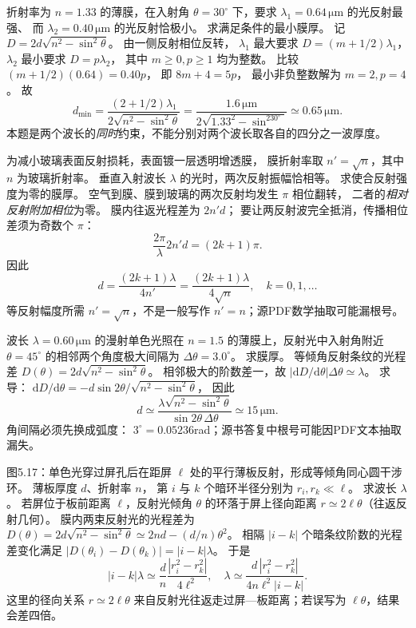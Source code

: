 折射率为 $n=1.33$ 的薄膜，在入射角
$\theta=30^\circ$ 下，要求
$\lambda_1=0.64\,\mathrm{\mu m}$ 的光反射最强、
而 $\lambda_2=0.40\,\mathrm{\mu m}$ 的光反射恰极小。
求满足条件的最小膜厚。
\exsolution
记
$D=2d\sqrt{n^2-\sin^2\theta}$。
由一侧反射相位反转，
$\lambda_1$ 最大要求
$D=(m+1/2)\lambda_1$，
$\lambda_2$ 最小要求
$D=p\lambda_2$，
其中 $m\ge0,p\ge1$ 均为整数。
比较
$(m+1/2)(0.64)=0.40p$，
即 $8m+4=5p$，
最小非负整数解为
$m=2,p=4$。
故
\[
\boxed{d_{\min}=
\frac{(2+1/2)\lambda_1}
{2\sqrt{n^2-\sin^2\theta}}
=\frac{1.6\,\mathrm{\mu m}}
{2\sqrt{1.33^2-\sin^230^\circ}}
\simeq0.65\,\mathrm{\mu m}}.
\]
\excheck 本题是两个波长的\emph{同时}约束，不能分别对两个波长取各自的四分之一波厚度。

为减小玻璃表面反射损耗，表面镀一层透明增透膜，
膜折射率取 $n'=\sqrt n$，其中 $n$ 为玻璃折射率。
垂直入射波长 $\lambda$ 的光时，两次反射振幅恰相等。
求使合反射强度为零的膜厚。
\exsolution
空气到膜、膜到玻璃的两次反射均发生 $\pi$ 相位翻转，
二者的\emph{相对反射附加相位}为零。
膜内往返光程差为 $2n'd$；
要让两反射波完全抵消，传播相位差须为奇数个 $\pi$：
\[
\frac{2\pi}{\lambda}2n'd=(2k+1)\pi.
\]
因此
\[
\boxed{d=\frac{(2k+1)\lambda}{4n'}
=\frac{(2k+1)\lambda}{4\sqrt n}},\quad k=0,1,\ldots
\]
\excheck 等反射幅度所需 $n'=\sqrt n$，不是一般写作 $n'=n$；源PDF数学抽取可能漏根号。

波长 $\lambda=0.60\,\mathrm{\mu m}$ 的漫射单色光照在
$n=1.5$ 的薄膜上，反射光中入射角附近
$\theta=45^\circ$ 的相邻两个角度极大间隔为
$\Delta\theta=3.0^\circ$。
求膜厚。
\exsolution
等倾角反射条纹的光程差
$D(\theta)=2d\sqrt{n^2-\sin^2\theta}$。
相邻极大的阶数差一，故
$|\mathrm dD/\mathrm d\theta|\Delta\theta\simeq\lambda$。
求导：
$\mathrm dD/\mathrm d\theta
=-d\sin2\theta/\sqrt{n^2-\sin^2\theta}$，
因此
\[
\boxed{d\simeq
\frac{\lambda\sqrt{n^2-\sin^2\theta}}
{\sin2\theta\,\Delta\theta}
\simeq15\,\mathrm{\mu m}}.
\]
\excheck 角间隔必须先换成弧度：
$3^\circ=0.05236$rad；源书答复中根号可能因PDF文本抽取漏失。

图5.17：单色光穿过屏孔后在距屏
$\ell$ 处的平行薄板反射，形成等倾角同心圆干涉环。
薄板厚度 $d$、折射率 $n$，
第 $i$ 与 $k$ 个暗环半径分别为
$r_i,r_k\ll\ell$。
求波长 $\lambda$。
\exsolution
若屏位于板前距离 $\ell$，反射光倾角 $\theta$ 的环落于屏上径向距离
$r\simeq2\ell\theta$（往返反射几何）。
膜内两束反射光的光程差为
$D(\theta)=2d\sqrt{n^2-\sin^2\theta}
\simeq2nd-(d/n)\theta^2$。
相隔 $|i-k|$ 个暗条纹阶数的光程差变化满足
$|D(\theta_i)-D(\theta_k)|=|i-k|\lambda$。
于是
\[
|i-k|\lambda\simeq\frac d n
\frac{|r_i^2-r_k^2|}{4\ell^2},
\quad
\boxed{\lambda\simeq
\frac{d\,|r_i^2-r_k^2|}
{4n\ell^2|i-k|}}.
\]
\excheck 这里的径向关系 $r\simeq2\ell\theta$ 来自反射光往返走过屏—板距离；若误写为 $\ell\theta$，结果会差四倍。

